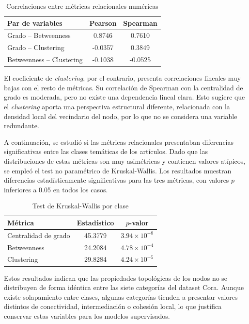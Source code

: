 \documentclass[conference,a4paper]{IEEEtran}
\begin{document}
\begin{table}[htbp]
\caption{Correlaciones entre métricas relacionales numéricas}
\centering
\begin{tabular}{lcc}
\toprule
Par de variables & Pearson & Spearman \\
\midrule
Grado -- Betweenness & 0.8746 & 0.7610 \\
Grado -- Clustering & -0.0357 & 0.3849 \\
Betweenness -- Clustering & -0.1038 & -0.0525 \\
\bottomrule
\end{tabular}
\label{tab:correlaciones-relacionales}
\end{table}

El coeficiente de \textit{clustering}, por el contrario, presenta correlaciones lineales muy bajas con el resto de métricas. Su correlación de Spearman con la centralidad de grado es moderada, pero no existe una dependencia lineal clara. Esto sugiere que el \textit{clustering} aporta una perspectiva estructural diferente, relacionada con la densidad local del vecindario del nodo, por lo que no se considera una variable redundante.

A continuación, se estudió si las métricas relacionales presentaban diferencias significativas entre las clases temáticas de los artículos. Dado que las distribuciones de estas métricas son muy asimétricas y contienen valores atípicos, se empleó el test no paramétrico de Kruskal-Wallis. Los resultados muestran diferencias estadísticamente significativas para las tres métricas, con valores $p$ inferiores a 0.05 en todos los casos.

\begin{table}[htbp]
\caption{Test de Kruskal-Wallis por clase}
\centering
\begin{tabular}{lcc}
\toprule
Métrica & Estadístico & $p$-valor \\
\midrule
Centralidad de grado & 45.3779 & $3.94 \times 10^{-8}$ \\
Betweenness & 24.2084 & $4.78 \times 10^{-4}$ \\
Clustering & 29.8284 & $4.24 \times 10^{-5}$ \\
\bottomrule
\end{tabular}
\label{tab:kruskal-relacionales}
\end{table}

Estos resultados indican que las propiedades topológicas de los nodos no se distribuyen de forma idéntica entre las siete categorías del dataset Cora. Aunque existe solapamiento entre clases, algunas categorías tienden a presentar valores distintos de conectividad, intermediación o cohesión local, lo que justifica conservar estas variables para los modelos supervisados.
\end{document}
